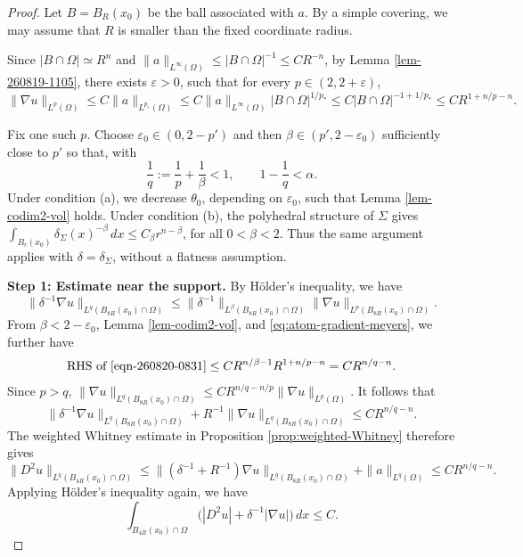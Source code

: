\documentclass[12pt]{amsart}
\numberwithin{equation}{section}
\newcommand{\epsi}{\varepsilon}
\begin{document}
\begin{proof}
Let $B=B_R(x_0)$ be the ball associated with $a$. By a simple covering, we may assume that $R$ is smaller than the fixed coordinate radius. 


Since $|B\cap\Omega|\simeq R^n$ and $\|a\|_{L^\infty(\Omega)} \leq |B\cap\Omega|^{-1} \leq CR^{-n}$, by Lemma \ref{lem-260819-1105}, there exists $\epsi>0$, such that for every $p \in (2,2+\epsi)$,
\begin{equation}
 \|\nabla u\|_{L^p(\Omega)}
 \leq C\|a\|_{L^{p_*}(\Omega)}
 \leq C\|a\|_{L^\infty(\Omega)} |B\cap\Omega|^{1/p_*}
 \leq C|B\cap\Omega|^{-1 + 1/p_*}
 \leq C R^{1+n/p-n}.
 \label{eq:atom-gradient-meyers}
\end{equation}

Fix one such $p$. Choose $\epsi_0\in(0,2-p')$ and then
$\beta\in(p',2-\epsi_0)$ sufficiently close to $p'$ so that, with
\begin{equation}
 \frac1q:=\frac1p+\frac1\beta<1,
 \qquad 1-\frac1q<\alpha.
 \label{eq:atom-exponent-choice}
\end{equation}
Under condition (a), we decrease $\theta_0$, depending on $\epsi_0$, such that Lemma \ref{lem-codim2-vol} holds. Under condition (b), the polyhedral structure of $\Sigma$ gives $\int_{B_r(x_0)}\delta_\Sigma(x)^{-\beta}\,dx
 \leq C_\beta r^{n-\beta}$, for all $0<\beta<2$.
Thus the same argument applies with $\delta=\delta_\Sigma$, without a flatness assumption.

\medskip

\noindent\textbf{Step 1: Estimate near the support.}
By H\"older's inequality, we have
\begin{equation} \label{eqn-260820-0831}
     \|\delta^{-1}\nabla u\|_{L^q(B_{8R}(x_0)\cap\Omega)}
    \leq 
    \|\delta^{-1}\|_{L^\beta(B_{8R}(x_0)\cap\Omega)} \|\nabla u\|_{L^p(B_{8R}(x_0)\cap\Omega)}.
\end{equation}
From $\beta < 2-\epsi_0$, Lemma \ref{lem-codim2-vol}, and \eqref{eq:atom-gradient-meyers}, we further have
\begin{align*}
    \text{RHS of \eqref{eqn-260820-0831}}
    \leq
    C R^{n/\beta-1}R^{1+n/p-n}
 =C R^{n/q-n}.
\end{align*}
Since $p>q$, $\|\nabla u\|_{L^q(B_{8R}(x_0)\cap\Omega)}
 \leq C R^{n/q-n/p}\|\nabla u\|_{L^p(\Omega)}$.
It follows that
\begin{equation}
 \|\delta^{-1}\nabla u\|_{L^q(B_{8R}(x_0)\cap\Omega)}
 +R^{-1}\|\nabla u\|_{L^q(B_{8R}(x_0)\cap\Omega)}
 \leq C R^{n/q-n}.
 \label{eq:atom-near-Lq}
\end{equation}
The weighted Whitney estimate in Proposition \ref{prop:weighted-Whitney} therefore gives
\[
 \|D^2u\|_{L^q(B_{4R}(x_0)\cap\Omega)}
 \leq 
 \|(\delta^{-1}+ R^{-1})\nabla u\|_{L^q(B_{8R}(x_0)\cap\Omega)} +\|a\|_{L^q(\Omega)}
 \leq
 C R^{n/q-n}.
\]
Applying H\"older's inequality again, we have
\begin{equation}
 \int_{B_{4R}(x_0)\cap\Omega}
 \bigl(|D^2u|+\delta^{-1}|\nabla u|\bigr)\,dx
 \leq C.
 \label{eq:atom-near-L1}
\end{equation}


\end{proof}
\end{document}
